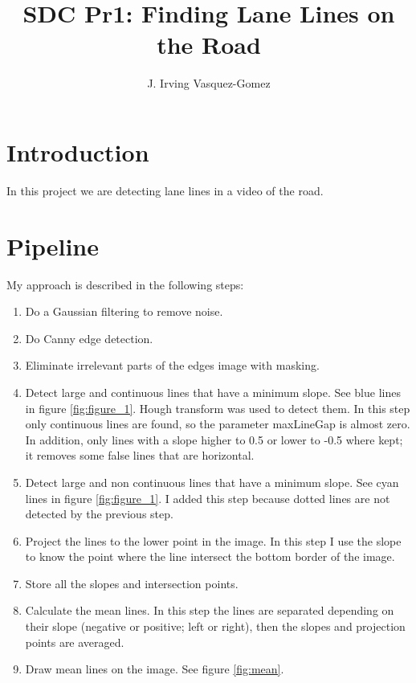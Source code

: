 \documentclass[]{article}
\title{SDC Pr1: Finding Lane Lines on the Road}
\author{J. Irving Vasquez-Gomez}
\begin{document}
\maketitle



\section{Introduction}

In this project we are detecting lane lines in a video of the road.

\section{Pipeline}

My approach is described in the following steps:

\begin{enumerate}
	\item Do a Gaussian filtering to remove noise.
	\item Do Canny edge detection.
	\item Eliminate irrelevant parts of the edges image with masking. 
	\item Detect large and continuous lines that have a minimum slope. See blue lines in figure \ref{fig:figure_1}. Hough transform was used to detect them. In this step only continuous lines are found, so the parameter maxLineGap is almost zero. In addition, only lines with a slope higher to 0.5 or lower to -0.5 where kept; it removes some false lines that are horizontal. 
	\item Detect large and non continuous lines that have a minimum slope. See cyan lines in figure \ref{fig:figure_1}.  I added this step because dotted lines are not detected by the previous step.
	\item Project the lines to the lower point in the image. In this step I use the slope to know the point where the line intersect the bottom border of the image.
	\item Store all the slopes and intersection points.
	\item Calculate the mean lines. In this step the lines are separated depending on their slope (negative or positive; left or right), then the slopes and projection points are averaged.
    \item Draw mean lines on the image. See figure \ref{fig:mean}.
\end{enumerate}
\end{document}
